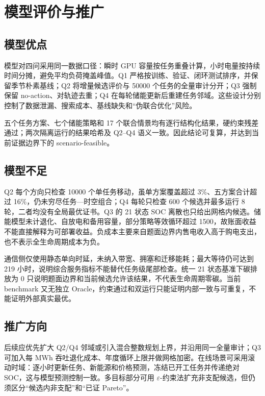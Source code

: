 \section{模型评价与推广}
\subsection{模型优点}
模型对四问采用同一数据口径：瞬时 GPU 容量按任务重叠计算，小时电量按持续时间分摊，避免平均负荷掩盖峰值。Q1 严格按训练、验证、闭环测试排序，并保留季节朴素基线；Q2 将增量候选评价与 50000 个任务的全量审计分开；Q3 强制保留 no-action、对轨迹去重；Q4 在每轮储能更新后重建任务邻域。这些设计分别控制了数据泄漏、搜索成本、基线缺失和“伪联合优化”风险。

五个任务方案、七个储能策略和 17 个联合情景均有逐行结构化结果，硬约束残差通过；两次隔离运行的结果哈希及 Q2--Q4 语义一致。因此结论可复算，并达到当前证据边界下的 scenario-feasible。

\subsection{模型不足}
Q2 每个方向只检查 10000 个单任务移动，虽单方案覆盖超过 3\%、五方案合计超过 16\%，仍未穷尽任务—时空组合；Q4 每轮只检查 600 个候选并最多运行 8 轮，二者均没有全局最优证书。Q3 的 21 状态 SOC 离散也只给出网格内候选。储能模型未计退化、自放电和备用容量，部分策略等效循环超过 1500，故账面收益不能直接解释为可部署收益。负成本主要来自题面边界内售电收入高于购电支出，也不表示全生命周期成本为负。

通信侧仅使用静态单向时延，未纳入带宽、拥塞和迁移能耗；最大等待仍可达到 219 小时，说明综合服务指标不能替代任务级尾部检查。统一 21 状态基准下碳排放为 0 只说明题面边界和当前候选允许该结果，不代表生命周期零碳。当前 benchmark 又无独立 Oracle，约束通过和双运行只能证明内部一致与可重复，不能证明外部真实最优。

\subsection{推广方向}
后续应优先扩大 Q2/Q4 邻域或引入混合整数规划上界，并沿用同一全量审计；Q3 可加入每 MWh 吞吐退化成本、年度循环上限并做网格加密。在线场景可采用滚动时域：逐小时更新任务、新能源和价格预测，冻结已开工任务并传递绝对 SOC，这与模型预测控制一致\cite{rawlings2017model}。多目标部分可用 $\varepsilon$-约束法扩充非支配候选\cite{miettinen1999nonlinear}，但仍须区分“候选内非支配”和“已证 Pareto”。
